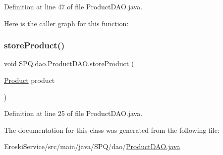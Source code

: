 Definition at line 47 of file Product\+D\+A\+O.\+java.

Here is the caller graph for this function\+:
\mbox{\label{class_s_p_q_1_1dao_1_1_product_d_a_o_ae890d625011f3c28730259820c9f4f3c}} 
\subsubsection{\texorpdfstring{store\+Product()}{storeProduct()}}
{\footnotesize\ttfamily void S\+P\+Q.\+dao.\+Product\+D\+A\+O.\+store\+Product (\begin{DoxyParamCaption}\item[{\mbox{\hyperlink{class_s_p_q_1_1data_1_1_product}{Product}}}]{product }\end{DoxyParamCaption})}



Definition at line 25 of file Product\+D\+A\+O.\+java.



The documentation for this class was generated from the following file\+:\begin{DoxyCompactItemize}
\item 
Eroski\+Service/src/main/java/\+S\+P\+Q/dao/\mbox{\hyperlink{_product_d_a_o_8java}{Product\+D\+A\+O.\+java}}\end{DoxyCompactItemize}
